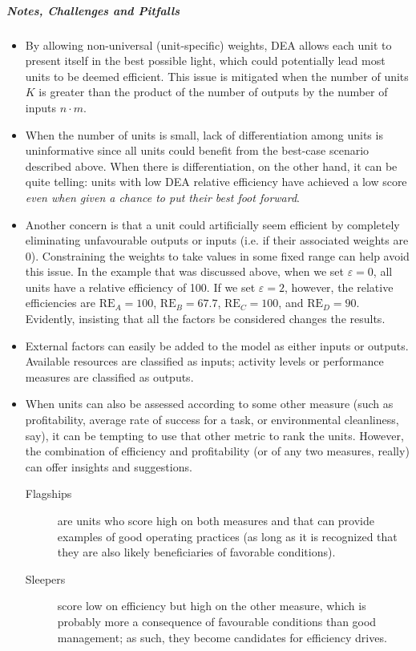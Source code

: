     \subparagraph*{Notes, Challenges and Pitfalls}
    \begin{itemize}[noitemsep]
    \item By allowing non-universal (unit-specific) weights, DEA allows each unit to present itself in the best possible light, which could potentially lead most units to be deemed efficient. This issue is mitigated when the number of units $K$ is greater than the product of the number of outputs by the number of inputs $n\cdot m$. 
    \item When the number of units is small, lack of differentiation among units is uninformative since all units could benefit from the best-case scenario described above. When there is differentiation, on the other hand, it can be quite telling: units with low DEA relative efficiency have achieved a low score \textit{even when given a chance to put their best foot forward}.   
\item Another concern is that a unit could artificially seem efficient by completely eliminating unfavourable outputs or inputs (i.e. if their associated weights are 0). Constraining the weights to take values in some fixed range can help avoid this issue. In the example that was discussed above, when we set $\varepsilon=0$, all units have a relative efficiency of 100. If we set $\varepsilon = 2$, however, the relative efficiencies are $\mbox{RE}_A=100$, $\mbox{RE}_B=67.7$, $\mbox{RE}_C=100$, and $\mbox{RE}_D=90$. Evidently, insisting that all the factors be considered changes the results.  
\item External factors can easily be added to the model as either inputs or outputs. Available resources are classified as inputs; activity levels or performance measures are classified as outputs. 
\item When units can also be assessed according to some other measure (such as profitability, average rate of success for a task, or environmental cleanliness, say), it can be tempting to use that other metric to rank the units. However, the combination of efficiency and profitability (or of any two measures, really) can offer insights and suggestions. \begin{description}
\item[Flagships] are units who score high on both measures and that can provide examples of good operating practices (as long as it is recognized that they are also likely beneficiaries of favorable conditions).  
\item[Sleepers] score low on efficiency but high on the other measure, which is probably more a consequence of favourable conditions than good management; as such, they become candidates for efficiency drives.  

\end{description}
\end{itemize}
